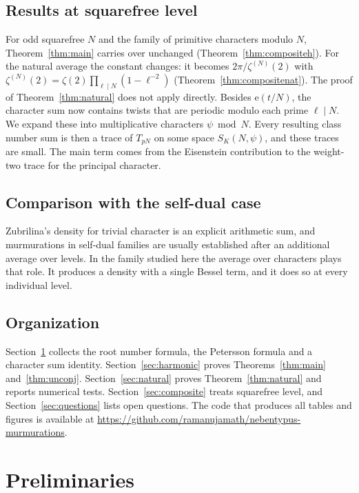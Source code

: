 \documentclass[11pt]{amsart}
\theoremstyle{remark}
\newcommand{\e}{\mathrm{e}}
\begin{document}
\subsection{Results at squarefree level}
For odd squarefree $N$ and the family of primitive characters modulo $N$, Theorem~\ref{thm:main} carries over unchanged (Theorem~\ref{thm:compositeh}). For the natural average the constant changes: it becomes $2\pi/\zeta^{(N)}(2)$ with $\zeta^{(N)}(2)=\zeta(2)\prod_{\ell\mid N}(1-\ell^{-2})$ (Theorem~\ref{thm:compositenat}). The proof of Theorem~\ref{thm:natural} does not apply directly. Besides $\e(t/N)$, the character sum now contains twists that are periodic modulo each prime $\ell\mid N$. We expand these into multiplicative characters $\psi\bmod N$. Every resulting class number sum is then a trace of $T_{pN}$ on some space $S_K(N,\psi)$, and these traces are small. The main term comes from the Eisenstein contribution to the weight-two trace for the principal character.

\subsection{Comparison with the self-dual case}
Zubrilina's density for trivial character is an explicit arithmetic sum, and murmurations in self-dual families are usually established after an additional average over levels. In the family studied here the average over characters plays that role. It produces a density with a single Bessel term, and it does so at every individual level.

\subsection*{Organization}
Section~\ref{sec:prelim} collects the root number formula, the Petersson formula and a character sum identity. Section~\ref{sec:harmonic} proves Theorems~\ref{thm:main} and~\ref{thm:unconj}. Section~\ref{sec:natural} proves Theorem~\ref{thm:natural} and reports numerical tests. Section~\ref{sec:composite} treats squarefree level, and Section~\ref{sec:questions} lists open questions. The code that produces all tables and figures is available at \url{https://github.com/ramanujamath/nebentypus-murmurations}.

\section{Preliminaries}\label{sec:prelim}
\end{document}
